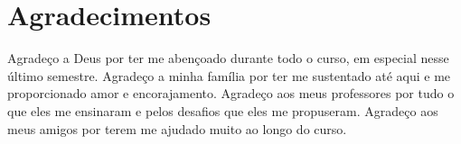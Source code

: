 \chapter*{Agradecimentos}

Agradeço a Deus por ter me abençoado durante todo o curso, em especial nesse último semestre.
Agradeço a minha família por ter me sustentado até aqui e me proporcionado amor e encorajamento.
Agradeço aos meus professores por tudo o que eles me ensinaram e pelos desafios que eles me propuseram.
Agradeço aos meus amigos por terem me ajudado muito ao longo do curso.
